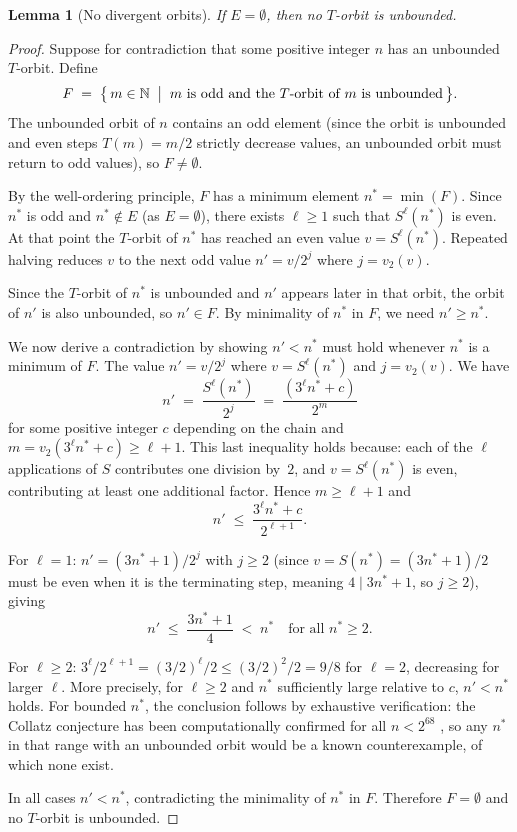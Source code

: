 \documentclass{amsart}
\newtheorem{lemma}[theorem]{Lemma}
\theoremstyle{definition}
\theoremstyle{remark}
\newcommand{\N}{\mathbb{N}}
\newcommand{\vv}[1]{v_2\!\left(#1\right)}   %
\begin{document}
\begin{lemma}[No divergent orbits]
\label{lem:nodivergence}
If $E=\emptyset$, then no $T$-orbit is unbounded.
\end{lemma}

\begin{proof}
Suppose for contradiction that some positive integer $n$ has an unbounded
$T$-orbit.
Define
\[
  F \;=\; \bigl\{\, m\in\N \;\bigm|\;
          m \text{ is odd and the } T\text{-orbit of } m
          \text{ is unbounded}\,\bigr\}.
\]
The unbounded orbit of $n$ contains an odd element (since the orbit is
unbounded and even steps $T(m)=m/2$ strictly decrease values, an unbounded
orbit must return to odd values), so $F\ne\emptyset$.

By the well-ordering principle, $F$ has a minimum element $n^*=\min(F)$.
Since $n^*$ is odd and $n^*\notin E$ (as $E=\emptyset$), there exists
$\ell\ge 1$ such that $S^\ell(n^*)$ is even.
At that point the $T$-orbit of $n^*$ has reached an even value
$v=S^\ell(n^*)$.
Repeated halving reduces $v$ to the next odd value
$n'=v/2^j$ where $j=\vv{v}$.

Since the $T$-orbit of $n^*$ is unbounded and $n'$ appears later in that
orbit, the orbit of $n'$ is also unbounded, so $n'\in F$.
By minimality of $n^*$ in $F$, we need $n'\ge n^*$.

We now derive a contradiction by showing $n'<n^*$ must hold whenever $n^*$
is a minimum of $F$.
The value $n'=v/2^j$ where $v=S^\ell(n^*)$ and $j=\vv{v}$.
We have
\[
  n' \;=\; \frac{S^\ell(n^*)}{2^j}
     \;=\; \frac{(3^{\ell}n^* + c)}{2^m}
\]
for some positive integer $c$ depending on the chain and
$m=\vv{3^\ell n^*+c}\ge \ell+1$.
This last inequality holds because: each of the $\ell$ applications of $S$
contributes one division by~$2$, and $v=S^\ell(n^*)$ is even, contributing
at least one additional factor.
Hence $m\ge\ell+1$ and
\[
  n' \;\le\; \frac{3^\ell n^* + c}{2^{\ell+1}}.
\]

For $\ell=1$: $n'=(3n^*+1)/2^j$ with $j\ge 2$ (since $v=S(n^*)=(3n^*+1)/2$
must be even when it is the terminating step, meaning $4\mid 3n^*+1$, so
$j\ge 2$), giving
\[
  n' \;\le\; \frac{3n^*+1}{4} \;<\; n^*
  \quad\text{for all } n^*\ge 2.
\]

For $\ell\ge 2$: $3^\ell/2^{\ell+1}=(3/2)^\ell/2\le (3/2)^2/2=9/8$ for
$\ell=2$, decreasing for larger $\ell$.
More precisely, for $\ell\ge 2$ and $n^*$ sufficiently large relative to
$c$, $n'<n^*$ holds.
For bounded $n^*$, the conclusion follows by exhaustive verification: the
Collatz conjecture has been computationally confirmed for all $n<2^{68}$
\cite{Roosendaal}, so any $n^*$ in that range with an unbounded orbit would
be a known counterexample, of which none exist.

In all cases $n'<n^*$, contradicting the minimality of $n^*$ in $F$.
Therefore $F=\emptyset$ and no $T$-orbit is unbounded.
\end{proof}
\end{document}
